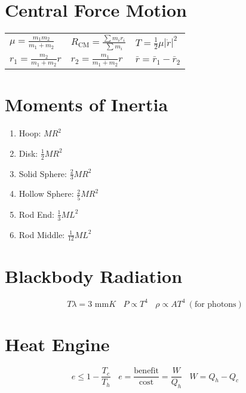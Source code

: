 \documentclass[10pt,a4paper]{article}
\begin{document}
\section{Central Force Motion} %
\label{sec:central_force_motion}
\begin{tabular}{l l l}
$\mu = \frac{m_1 m_2}{m_1 + m_2}$ & $R_{\textrm{CM}} = \frac{\sum m_i r_i}{\sum m_i}$ & $T = \frac{1}{2} \mu |\dot{r} | ^2$\\
$r_1 = \frac{m_2}{m_1 + m_2}r$ & $r_2 = \frac{m_1}{m_1 + m_2} r$ & $\bar{r} = \bar{r}_1 - \bar{r}_2$
\end{tabular}

\section{Moments of Inertia} %
\label{sec:moments_of_inertia}
\begin{enumerate}
    \item Hoop: $MR^2$
    \item Disk: $\frac{1}{2}MR^2$
    \item Solid Sphere: $\frac{2}{3}MR^2$
    \item Hollow Sphere: $\frac{2}{5} MR^2$
    \item Rod End: $ \frac{1}{3} ML^2$
    \item Rod Middle: $ \frac{1}{12} ML^2$
\end{enumerate}

\section{Blackbody Radiation} %
\label{sec:blackbody_radiation}
\begin{equation}
    T \lambda = 3 \textrm{ mm}K~~~~P \propto T^4~~~~ \rho \propto AT^4 ~(\textrm{for photons})
\end{equation}

\section{Heat Engine} %
\label{sec:heat_engine}
\begin{equation}
    e \leq 1 - \frac{T_c}{T_h}~~~~ e = \frac{\textrm{benefit}}{\textrm{cost}} = \frac{W}{Q_h}~~~~ W = Q_h - Q_c
\end{equation}
\end{document}
